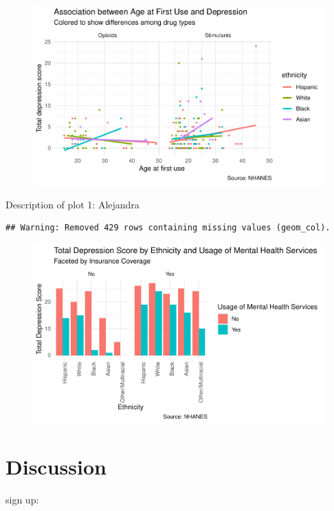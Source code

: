 \documentclass[man]{apa6}
\begin{document}
\begin{figure}
\centering
\includegraphics{Final_Paper_Group_3_files/figure-latex/ST_fig4-1.pdf}
\caption{}
\end{figure}

Description of plot 1: Alejandra

\begin{verbatim}
## Warning: Removed 429 rows containing missing values (geom_col).
\end{verbatim}

\begin{figure}
\centering
\includegraphics{Final_Paper_Group_3_files/figure-latex/AG_fig5-1.pdf}
\caption{}
\end{figure}

\section{Discussion}\label{discussion}

sign up:
\end{document}
